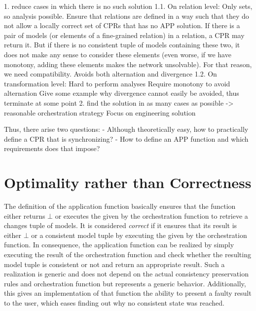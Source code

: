 1. reduce cases in which there is no such solution
1.1. On relation level: Only sets, so analysis possible.
Ensure that relations are defined in a way such that they do not allow a locally correct set of CPRs that has no APP solution. If there is a pair of models (or elements of a fine-grained relation) in a relation, a CPR may return it. But if there is no consistent tuple of models containing these two, it does not make any sense to consider these elements (even worse, if we have monotony, adding these elements makes the network unsolvable). For that reason, we need compatibility. Avoids both alternation and divergence
1.2. On transformation level: Hard to perform analyses
Require monotony to avoid alternation
Give some example why divergence cannot easily be avoided, thus terminate at some point
2. find the solution in as many cases as possible -> reasonable orchestration strategy
Focus on engineering solution 


Thus, there arise two questions:
- Although theoretically easy, how to practically define a CPR that is synchronizing?
- How to define an APP function and which requirements does that impose?




\section{Optimality rather than Correctness}

The definition of the application function basically ensures that the function either returns $\bot$ or executes the \modellevelconsistencypreservationrules given by the orchestration function to retrieve a changes tuple of models.
It is considered \emph{correct} if it ensures that its result is either $\bot$ or a consistent model tuple by executing the \modellevelconsistencypreservationrules given by the orchestration function.
In consequence, the application function can be realized by simply executing the result of the orchestration function and check whether the resulting model tuple is consistent or not and return an appropriate result.
Such a realization is generic and does not depend on the actual consistency preservation rules and orchestration function but represents a generic behavior.
Additionally, this gives an implementation of that function the ability to present a faulty result to the user, which eases finding out why no consistent state was reached.

